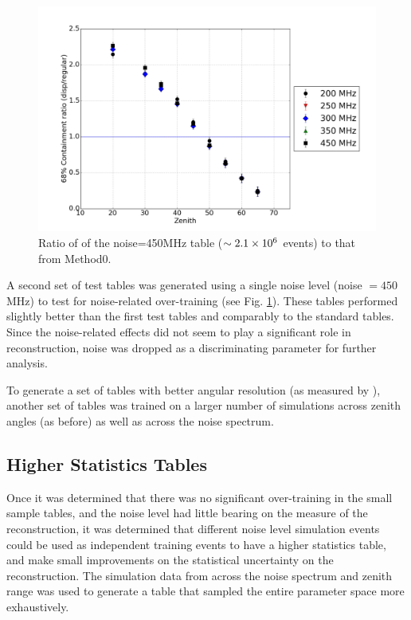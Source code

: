 \documentclass[main.tex]{subfiles}
\begin{document}
\begin{figure}[htbp]
  \centering
  \includegraphics[width=0.8\linewidth]{images/disp_450_ratio_xzen}
  \caption[\disp table reconstruction vs noise.]{Ratio of \rse of the noise=450MHz \disp table ($\sim 2.1\times 10^{6}$ events) to that from Method0.}
  \label{fig:disp_ratio_450}
\end{figure}

A second set of test \disp tables was generated using a single noise level (noise $= 450$ MHz) to test for noise-related over-training (see Fig. \ref{fig:disp_ratio_450}). These tables performed slightly better than the first test tables and comparably to the standard \disp tables. Since the noise-related effects did not seem to play a significant role in reconstruction, noise was dropped as a discriminating parameter for further analysis.

To generate a set of \disp tables with better angular resolution (as measured by \rse\hspace{-4pt}), another set of \disp tables was trained on a larger number of simulations across zenith angles (as before) as well as across the noise spectrum.

\subsection{Higher Statistics Tables}
Once it was determined that there was no significant over-training in the small sample \disp tables, and the noise level had little bearing on the \rse measure of the reconstruction, it was determined that different noise level simulation events could be used as independent training events to have a higher statistics \disp table, and make small improvements on the statistical uncertainty on the reconstruction. The simulation data from across the noise spectrum and zenith range was used to generate a \disp table that sampled the entire parameter space more exhaustively.
\end{document}
